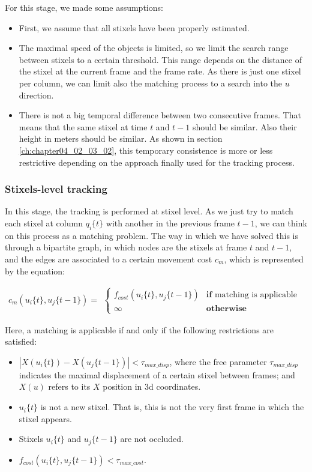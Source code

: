 For this stage, we made some assumptions:
\begin{itemize}
 \item First, we assume that all stixels have been properly estimated.
 \item The maximal speed of the objects is limited, so we limit the search range between stixels to a certain threshold. This range depends on the distance of the stixel at the current frame and the frame rate. As there is just one stixel per column, we can limit also the matching process to a search into the $u$ direction.
 \item There is not a big temporal difference between two consecutive frames. That means that the same stixel at time $t$ and $t - 1$ should be similar. Also their height in meters should be similar. As shown in section \ref{ch:chapter04_02_03_02}, this temporary consistence is more or less restrictive depending on the approach finally used for the tracking process.
\end{itemize}

\subsubsection{Stixels-level tracking}\label{ch:chapter04_01_03_01}

In this stage, the tracking is performed at stixel level. As we just try to match each stixel at column $q_i\{t\}$ with another in the previous frame $t - 1$, we can think on this process as a matching problem. The way in which we have solved this is through a bipartite graph, in which nodes are the stixels at frame $t$ and $t - 1$, and the edges are associated to a certain movement cost $c_m$, which is represented by the equation:

\begin{equation}\label{eq:cp04_stixel_movement_cost}
  c_m(u_i\{t\}, u_j\{t - 1\}) = 
  \begin{align*}
    \begin{cases}
    f_{cost}(u_i\{t\}, u_j\{t - 1\}) & \textbf{if} \text{ matching is applicable} \\
    \infty & \textbf{otherwise}
    \end{cases}
  \end{align*}
\end{equation}

Here, a matching is applicable if and only if the following restrictions are satisfied:
\begin{itemize}
 \item $|X(u_i\{t\}) - X(u_j\{t - 1\})| < \tau_{max\_disp}$, where the free parameter $\tau_{max\_disp}$ indicates the maximal displacement of a certain stixel between frames; and $X(u)$ refers to its $X$ position in 3d coordinates.
 \item $u_i\{t\}$ is not a new stixel. That is, this is not the very first frame in which the stixel appears.
 \item Stixels $u_i\{t\}$ and $u_j\{t - 1\}$ are not occluded.
 \item $f_{cost}(u_i\{t\}, u_j\{t - 1\}) < \tau_{max\_cost}$.
\end{itemize}

